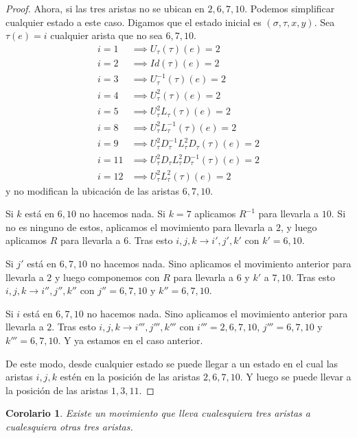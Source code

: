 \documentclass{article}
\newtheorem{corolario}{Corolario}[section]
\theoremstyle{definition}
\begin{document}
\begin{proof}
    Ahora, si las tres aristas no se ubican en $2,6,7,10$. Podemos simplificar cualquier estado a este caso. Digamos que el estado inicial es $(\sigma,\tau,x,y)$. Sea $\tau(e)=i$ cualquier arista que no sea $6,7,10$.
    \begin{align*}
        i=1  & \implies U_\tau(\tau)(e)=2                                 \\
        i=2  & \implies Id(\tau)(e)=2                                     \\
        i=3  & \implies U^{-1}_\tau(\tau)(e)=2                            \\
        i=4  & \implies U^2_\tau(\tau)(e)=2                               \\
        i=5  & \implies U^2_\tau L_\tau (\tau)(e)=2                       \\
        i=8  & \implies U^2_\tau L^{-1}_\tau(\tau)(e)=2                   \\
        i=9  & \implies U^2_\tau D^{-1}_\tau L^{2}_\tau D_\tau(\tau)(e)=2 \\
        i=11 & \implies U^2_\tau D_\tau L^{2}_\tau D^{-1}_\tau(\tau)(e)=2 \\
        i=12 & \implies U^2_\tau L^{2}_\tau(\tau)(e)=2
    \end{align*}
    y no modifican la ubicación de las aristas $6,7,10$.

    Si $k$ está en $6,10$ no hacemos nada. Si $k=7$ aplicamos $R^{-1}$ para llevarla a $10$. Si no es ninguno de estos, aplicamos el movimiento para llevarla a $2$, y luego aplicamos $R$ para llevarla a $6$. Tras esto $i,j,k\to i',j',k'$ con $k'=6,10$.

    Si $j'$ está en $6,7,10$ no hacemos nada. Sino aplicamos el movimiento anterior para llevarla a $2$ y luego componemos con $R$ para llevarla a $6$ y $k'$ a $7,10$. Tras esto $i,j,k\to i'',j'',k''$ con $j''=6,7,10$ y $k''=6,7,10$.

    Si $i$ está en $6,7,10$ no hacemos nada. Sino aplicamos el movimiento anterior para llevarla a $2$. Tras esto $i,j,k\to i''',j''',k'''$ con $i'''=2,6,7,10$, $j'''=6,7,10$ y $k'''=6,7,10$. Y ya estamos en el caso anterior.

    De este modo, desde cualquier estado se puede llegar a un estado en el cual las aristas $i,j,k$ estén en la posición de las aristas $2,6,7,10$. Y luego se puede llevar a la posición de las aristas $1,3,11$.
\end{proof}
\begin{corolario}
    Existe un movimiento que lleva cualesquiera tres aristas a cualesquiera otras tres aristas.
\end{corolario}
\end{document}
